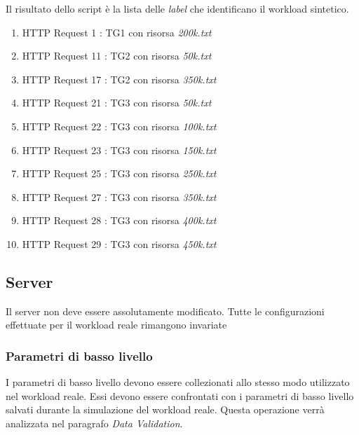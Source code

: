 Il risultato dello script è la lista delle \textit{label} che identificano il workload sintetico.
\begin{enumerate}
	\item HTTP Request 1 : TG1 con risorsa \textit{200k.txt}
	\item HTTP Request 11 : TG2 con risorsa \textit{50k.txt}
	\item HTTP Request 17 : TG2 con risorsa \textit{350k.txt}
	\item HTTP Request 21 : TG3 con risorsa \textit{50k.txt}	
	\item HTTP Request 22 : TG3 con risorsa \textit{100k.txt}		
	\item HTTP Request 23 : TG3 con risorsa \textit{150k.txt}		
	\item HTTP Request 25 : TG3 con risorsa \textit{250k.txt}		
	\item HTTP Request 27 : TG3 con risorsa \textit{350k.txt}
	\item HTTP Request 28 : TG3 con risorsa \textit{400k.txt}			
	\item HTTP Request 29 : TG3 con risorsa \textit{450k.txt}		
\end{enumerate}

\subsection{Server}
Il server non deve essere assolutamente modificato. Tutte le configurazioni effettuate per il workload reale rimangono invariate

\subsubsection{Parametri di basso livello}
I parametri di basso livello devono essere collezionati allo stesso modo utilizzato nel workload reale. Essi devono essere confrontati con i parametri di basso livello salvati durante la simulazione del workload reale. Questa operazione verrà analizzata nel paragrafo \textit{Data Validation}.

